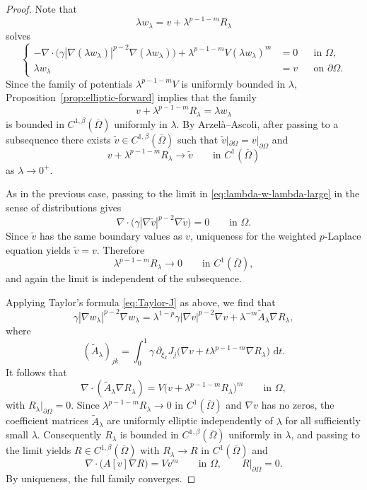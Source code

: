 \documentclass[a4paper,12pt]{article}
\newcommand{\pr}{\partial}
\newcommand{\dd}{\,\mathrm{d}}
\theoremstyle{definition}
\theoremstyle{remark}
\begin{document}
\begin{proof}
Note that
\[
\lambda w_\lambda=v+\lambda^{p-1-m}R_\lambda
\]
solves
\begin{equation}\label{eq:lambda-w-lambda-large}
\left\{
\begin{aligned}
-\nabla\cdot\bigl(\gamma|\nabla(\lambda w_\lambda)|^{p-2}\nabla(\lambda w_\lambda)\bigr)+\lambda^{p-1-m}V(\lambda w_\lambda)^m&=0 &&\text{in }\Omega,\\
 \lambda w_\lambda&=v &&\text{on }\pr\Omega.
\end{aligned}
\right.
\end{equation}
Since the family of potentials $\lambda^{p-1-m}V$ is uniformly bounded in $\lambda$, Proposition~\ref{prop:elliptic-forward} implies that the family
\[
v+\lambda^{p-1-m}R_\lambda=\lambda w_\lambda
\]
is bounded in $C^{1,\beta}(\overline\Omega)$ uniformly in $\lambda$. By Arzel\`a--Ascoli, after passing to a subsequence there exists $\tilde v\in C^{1,\beta}(\overline\Omega)$ such that $\tilde v|_{\pr\Omega}=v|_{\pr\Omega}$ and
\[
v+\lambda^{p-1-m}R_\lambda\to\tilde v
\qquad\text{in }C^1(\overline\Omega)
\]
as $\lambda\to0^+$.

As in the previous case, passing to the limit in \eqref{eq:lambda-w-lambda-large} in the sense of distributions gives
\[
\nabla\cdot\bigl(\gamma|\nabla\tilde v|^{p-2}\nabla\tilde v\bigr)=0
\qquad\text{in }\Omega.
\]
Since $\tilde v$ has the same boundary values as $v$, uniqueness for the weighted $p$-Laplace equation yields $\tilde v=v$. Therefore
\[
\lambda^{p-1-m}R_\lambda\to0
\qquad\text{in }C^1(\overline\Omega),
\]
and again the limit is independent of the subsequence.

Applying Taylor's formula \eqref{eq:Taylor-J} as above, we find that
\[
\gamma|\nabla w_\lambda|^{p-2}\nabla w_\lambda
=\lambda^{1-p}\gamma|\nabla v|^{p-2}\nabla v+\lambda^{-m}\widetilde A_\lambda\nabla R_\lambda,
\]
where
\[
(\widetilde A_\lambda)_{jk}=\int_0^1\gamma\,\pr_{\xi_k}J_j\bigl(\nabla v+t\lambda^{p-1-m}\nabla R_\lambda\bigr)\,\dd t.
\]
It follows that
\[
\nabla\cdot(\widetilde A_\lambda\nabla R_\lambda)=V\bigl(v+\lambda^{p-1-m}R_\lambda\bigr)^m
\qquad\text{in }\Omega,
\]
with $R_\lambda|_{\pr\Omega}=0$. Since $\lambda^{p-1-m}R_\lambda\to0$ in $C^1(\overline\Omega)$ and $\nabla v$ has no zeros, the coefficient matrices $\widetilde A_\lambda$ are uniformly elliptic independently of $\lambda$ for all sufficiently small $\lambda$. Consequently $R_\lambda$ is bounded in $C^{1,\beta}(\overline\Omega)$ uniformly in $\lambda$, and passing to the limit yields $R\in C^{1,\beta}(\overline\Omega)$ with $R_\lambda\to R$ in $C^1(\overline\Omega)$ and
\[
\nabla\cdot\bigl(A[v]\nabla R\bigr)=Vv^m
\qquad\text{in }\Omega,
\qquad
R|_{\pr\Omega}=0.
\]
By uniqueness, the full family converges.


\end{proof}
\end{document}
